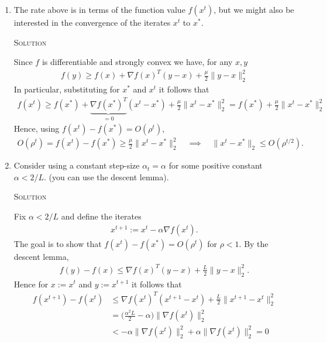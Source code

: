 \documentclass{article}
\begin{document}
\begin{enumerate}
\item The rate above is in terms of the function value $f(x^t)$, but we
  might also be interested in the convergence of the iterates $x^t$ to
  $x^*$. 

  \textsc{Solution}

  Since $f$ is differentiable and strongly convex we have, for any $x, y$
  \begin{align*}
    f(y) \geq f(x) + \nabla f(x)^T(y-x) + \frac{\mu}{2} \|y-x\|_2^2
  \end{align*}
  In particular, substituting for $x^*$ and $x^t$ it follows that
  \begin{align*}
    f(x^t) %
    \geq f(x^*) %
    + \underbrace{\nabla f(x^*)^T}_{=0} (x^t - x^*) %
    + \frac{\mu}{2} \|x^t - x^*\|_2^2 %
    = f(x^*) + \frac{\mu}{2} \|x^t - x^*\|_2^2
  \end{align*}
  Hence, using $f(x^t) - f(x^*) = O(\rho^t)$,
  \begin{align*}
    O(\rho^t) = f(x^t) - f(x^*) \geq \frac{\mu}{2} \|x^t - x^*\|_2^2  %
    \quad \implies \quad %
    \|x^t - x^*\|_2 \leq O(\rho^{t/2}).
  \end{align*}

  
\item Consider using a constant step-size $\alpha_t = \alpha$ for some positive
  constant $\alpha < 2/L$.  (you can use the descent lemma).

  \textsc{Solution}

  Fix $\alpha < 2/L$ and define the iterates
  \begin{align*}
    x^{t+1} := x^t - \alpha \nabla f(x^t).
  \end{align*}
  The goal is to show that $f(x^t) - f(x^*) = O (\rho^t)$ for $\rho < 1$.  By
  the descent lemma,
  \begin{align*}
    f(y) - f(x) \leq \nabla f(x)^T (y-x) + \frac{L}{2} \|y - x\|_2^2. 
  \end{align*}
  Hence for $x := x^t$ and $y := x^{t+1}$ it follows that
  \begin{align*}
    f(x^{t+1}) - f(x^t) %
    &\leq \nabla f(x^t)^T (x^{t+1}-x^t) + \frac{L}{2}
      \|x^{t+1} - x^t\|_2^2 \\
    &= \big(\frac{\alpha^2 L}{2} - \alpha\big) \|\nabla f(x^t)\|_2^2
    \\
    &< - \alpha \|\nabla f(x^t)\|_2^2 + \alpha \|\nabla f(x^t)\|_2^2 %
      = 0 
  \end{align*}




\end{enumerate}
\end{document}
